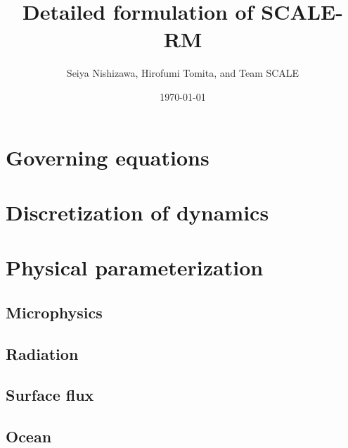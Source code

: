 \documentclass[a4paper]{report}
\title{{\LARGE Detailed formulation of SCALE-RM}}
\author{Seiya Nishizawa, Hirofumi Tomita, and Team SCALE}
\date{\today}
\begin{document}
\maketitle
\tableofcontents



\chapter{Governing equations}


\chapter{Discretization of dynamics}
\label{chap:discretization dynamics}














\chapter{Physical parameterization}



\section{Microphysics}






\section{Radiation}


\section{Surface flux}


\section{Ocean}

\end{document}
